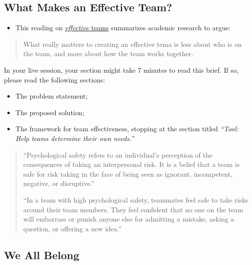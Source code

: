 \documentclass[
]{book}
\providecommand{\tightlist}{%
  \setlength{\itemsep}{0pt}\setlength{\parskip}{0pt}}
\theoremstyle{definition}
\theoremstyle{definition}
\theoremstyle{definition}
\theoremstyle{definition}
\theoremstyle{remark}
\begin{document}
\hypertarget{what-makes-an-effective-team}{%
\subsection{What Makes an Effective Team?}\label{what-makes-an-effective-team}}

\begin{itemize}
\tightlist
\item
  This reading on \href{https://rework.withgoogle.com/print/guides/5721312655835136/}{\emph{effective} teams} summarizes academic research to argue:
\end{itemize}

\begin{quote}
What really matters to creating an effective tema is less about who is on the team, and more about how the team works together.
\end{quote}

In your live session, your section might take 7 minutes to read this brief. If so, please read the following sections:

\begin{itemize}
\tightlist
\item
  The problem statement;
\item
  The proposed solution;
\item
  The framework for team effectiveness, stopping at the section titled \emph{``Tool: Help teams determine their own needs.''}
\end{itemize}

\begin{quote}
``Psychological safety refers to an individual's perception of the consequences of taking an interpersonal risk. It is a belief that a team is safe for risk taking in the face of being seen as ignorant, incompetent, negative, or disruptive.''

``In a team with high psychological safety, teammates feel safe to take risks around their team members. They feel confident that no one on the team will embarrass or punish anyone else for admitting a mistake, asking a question, or offering a new idea.''
\end{quote}

\hypertarget{we-all-belong}{%
\subsection{We All Belong}\label{we-all-belong}}
\end{document}
